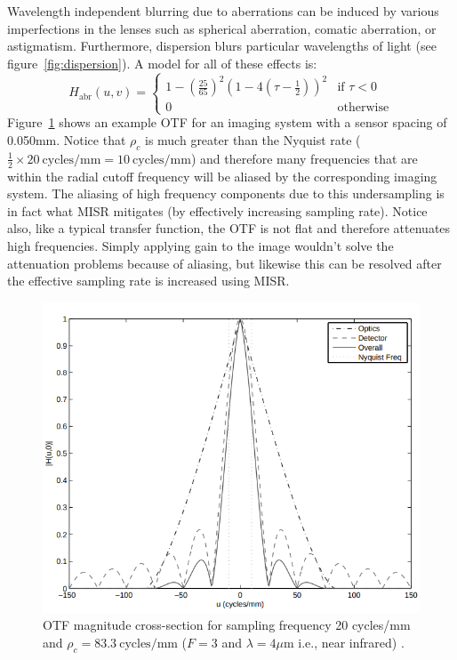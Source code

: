 Wavelength independent blurring due to aberrations can be induced by various imperfections in the lenses such as spherical aberration, comatic aberration, or astigmatism. Furthermore, dispersion blurs particular wavelengths of light (see figure~\ref{fig:dispersion}). A model for all of these effects \cite{10.1117.12.946501} is:
\begin{equation*}
	H_{\text{abr}}(u,v) =   \begin{cases}
		1-\left(\frac{25}{65}\right)^2 \left(1-4\left(\tau - \frac{1}{2}\right)\right)^2 & \text{if } \tau < 0 \\
		0                                                                                & \text{otherwise}
	\end{cases}
\end{equation*}
Figure~\ref{fig:mtf} shows an example OTF for an imaging system with a sensor spacing of 0.050mm.
%
Notice that \(\rho_c\) is much greater than the Nyquist rate (\(\frac{1}{2} \times 20~\text{cycles}/\text{mm} = 10~\text{cycles}/\text{mm}\)) and therefore many frequencies that are within the radial cutoff frequency will be aliased by the corresponding imaging system.
%
The aliasing of high frequency components due to this undersampling is in fact what MISR mitigates (by effectively increasing sampling rate).
%
Notice also, like a typical transfer function, the OTF is not flat and therefore attenuates high frequencies.
%
Simply applying gain to the image wouldn't solve the attenuation problems because of aliasing, but likewise this can be resolved after the effective sampling rate is increased using MISR.
\begin{figure}[!htbp]
	\includegraphics[width=\linewidth,keepaspectratio]{figures/background/mtf.png}
	\caption{OTF magnitude cross-section for sampling frequency 20 cycles/mm and \(\rho_c = 83.3~\text{cycles}/\text{mm}\) (\(F=3\) and \(\lambda = 4\mu\text{m}\) i.e., near infrared)      \cite{milanfar2017super}.}
	\label{fig:mtf}
\end{figure}

